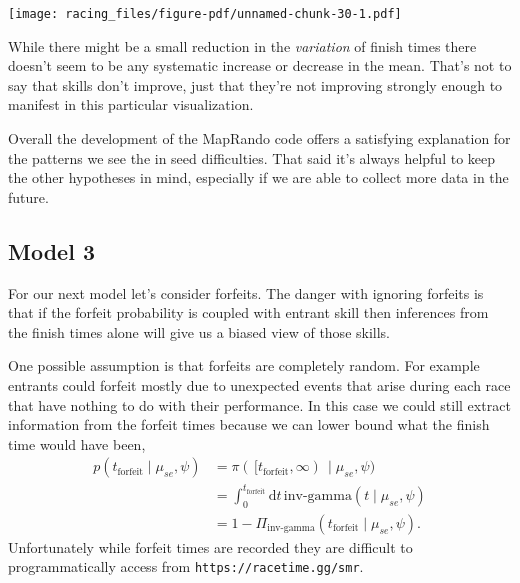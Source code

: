 \documentclass[
  letterpaper,
  DIV=11,
  numbers=noendperiod]{scrartcl}
\newenvironment{Shaded}{\begin{snugshade}}{\end{snugshade}}
\newcommand{\AttributeTok}[1]{\textcolor[rgb]{0.40,0.45,0.13}{#1}}
\newcommand{\DecValTok}[1]{\textcolor[rgb]{0.68,0.00,0.00}{#1}}
\newcommand{\FloatTok}[1]{\textcolor[rgb]{0.68,0.00,0.00}{#1}}
\newcommand{\FunctionTok}[1]{\textcolor[rgb]{0.28,0.35,0.67}{#1}}
\newcommand{\NormalTok}[1]{\textcolor[rgb]{0.00,0.23,0.31}{#1}}
\newcommand{\SpecialCharTok}[1]{\textcolor[rgb]{0.37,0.37,0.37}{#1}}
\newcommand{\StringTok}[1]{\textcolor[rgb]{0.13,0.47,0.30}{#1}}
\begin{document}
\begin{Shaded}
\end{Shaded}

\texttt{[image: racing\_files/figure-pdf/unnamed-chunk-30-1.pdf]}

While there might be a small reduction in the \emph{variation} of finish
times there doesn't seem to be any systematic increase or decrease in
the mean. That's not to say that skills don't improve, just that they're
not improving strongly enough to manifest in this particular
visualization.

Overall the development of the MapRando code offers a satisfying
explanation for the patterns we see the in seed difficulties. That said
it's always helpful to keep the other hypotheses in mind, especially if
we are able to collect more data in the future.

\subsection{Model 3}\label{model-3}

For our next model let's consider forfeits. The danger with ignoring
forfeits is that if the forfeit probability is coupled with entrant
skill then inferences from the finish times alone will give us a biased
view of those skills.

One possible assumption is that forfeits are completely random. For
example entrants could forfeit mostly due to unexpected events that
arise during each race that have nothing to do with their performance.
In this case we could still extract information from the forfeit times
because we can lower bound what the finish time would have been,
\begin{align*}
p(t_{\mathrm{forfeit}} \mid \mu_{se}, \psi)
&=
\pi( \, [ t_{\mathrm{forfeit}}, \infty ) \, \mid \mu_{se}, \psi)
\\
&=
\int_{0}^{t_{\mathrm{forfeit}}} \mathrm{d} t \,
\text{inv-gamma}(t \mid \mu_{se}, \psi)
\\
&=
1 - \Pi_{\text{inv-gamma}}(t_{\mathrm{forfeit}} \mid \mu_{se}, \psi).
\end{align*} Unfortunately while forfeit times are recorded they are
difficult to programmatically access from
\texttt{https://racetime.gg/smr}.
\end{document}
